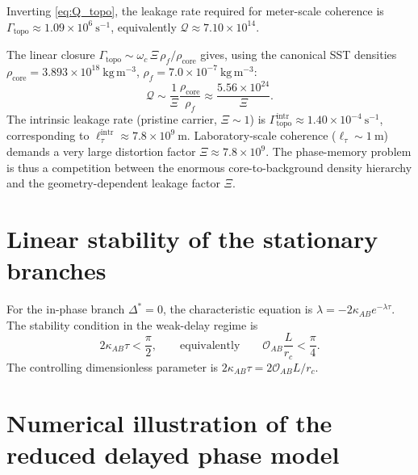 \documentclass[11pt]{article}
\newcommand{\rhoF}{\rho_{\!f}}
\newcommand{\rc}{r_c}
\newcommand{\rhocore}{\rho_{\text{core}}}
\begin{document}
Inverting \cref{eq:Q_topo}, the leakage rate required for meter-scale coherence is $\Gamma_{\mathrm{topo}} \approx 1.09\times 10^6~\mathrm{s^{-1}}$, equivalently $\mathcal{Q} \approx 7.10\times 10^{14}$.

The linear closure $\Gamma_{\mathrm{topo}} \sim \omega_c\,\Xi\,\rhoF/\rhocore$ gives, using the canonical SST densities $\rhocore = 3.893\times 10^{18}~\mathrm{kg\,m^{-3}}$, $\rhoF = 7.0\times 10^{-7}~\mathrm{kg\,m^{-3}}$:
\begin{equation}
    \mathcal{Q} \sim \frac{1}{\Xi}\frac{\rhocore}{\rhoF} \approx \frac{5.56\times 10^{24}}{\Xi}.
    \label{eq:Q_density_ratio}
\end{equation}
The intrinsic leakage rate (pristine carrier, $\Xi \sim 1$) is $\Gamma_{\mathrm{topo}}^{\mathrm{intr}} \approx 1.40\times 10^{-4}~\mathrm{s^{-1}}$, corresponding to $\ell_\tau^{\mathrm{intr}} \approx 7.8\times 10^9~\mathrm{m}$. Laboratory-scale coherence ($\ell_\tau \sim 1~\mathrm{m}$) demands a very large distortion factor $\Xi \approx 7.8\times 10^9$. The phase-memory problem is thus a competition between the enormous core-to-background density hierarchy and the geometry-dependent leakage factor $\Xi$.

\section{Linear stability of the stationary branches}

For the in-phase branch $\Delta^\ast = 0$, the characteristic equation is $\lambda = -2\kappa_{AB}e^{-\lambda\tau}$. The stability condition in the weak-delay regime is
\begin{equation}
    2\kappa_{AB}\tau < \frac{\pi}{2}, \qquad \text{equivalently} \qquad \mathcal{O}_{AB}\frac{L}{\rc} < \frac{\pi}{4}.
    \label{eq:stability}
\end{equation}
The controlling dimensionless parameter is $2\kappa_{AB}\tau = 2\mathcal{O}_{AB}L/\rc$.

\section{Numerical illustration of the reduced delayed phase model}
\end{document}
